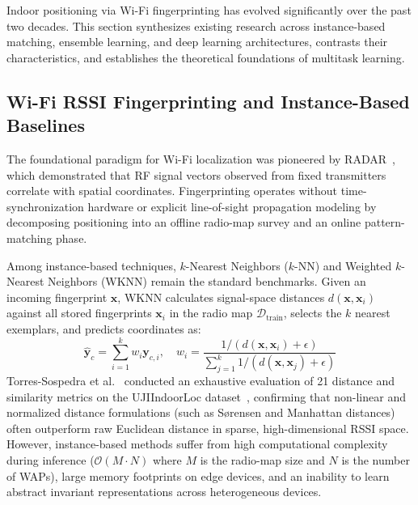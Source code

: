 
\label{sec:related-work}

Indoor positioning via Wi-Fi fingerprinting has evolved significantly over the past two decades. This section synthesizes existing research across instance-based matching, ensemble learning, and deep learning architectures, contrasts their characteristics, and establishes the theoretical foundations of multitask learning.

\subsection{Wi-Fi RSSI Fingerprinting and Instance-Based Baselines}
The foundational paradigm for Wi-Fi localization was pioneered by RADAR~\cite{torres2014ujiindoorloc}, which demonstrated that RF signal vectors observed from fixed transmitters correlate with spatial coordinates. Fingerprinting operates without time-synchronization hardware or explicit line-of-sight propagation modeling by decomposing positioning into an offline radio-map survey and an online pattern-matching phase.

Among instance-based techniques, $k$-Nearest Neighbors ($k$-NN) and Weighted $k$-Nearest Neighbors (WKNN) remain the standard benchmarks. Given an incoming fingerprint $\mathbf{x}$, WKNN calculates signal-space distances $d(\mathbf{x}, \mathbf{x}_i)$ against all stored fingerprints $\mathbf{x}_i$ in the radio map $\mathcal{D}_{\text{train}}$, selects the $k$ nearest exemplars, and predicts coordinates as:
\begin{equation}
    \hat{\mathbf{y}}_c = \sum_{i=1}^k w_i \mathbf{y}_{c,i}, \quad w_i = \frac{1 / (d(\mathbf{x}, \mathbf{x}_i) + \epsilon)}{\sum_{j=1}^k 1 / (d(\mathbf{x}, \mathbf{x}_j) + \epsilon)}
\end{equation}
Torres-Sospedra et al.~\cite{torres2015comprehensive} conducted an exhaustive evaluation of 21 distance and similarity metrics on the UJIIndoorLoc dataset~\cite{torres2014ujiindoorloc}, confirming that non-linear and normalized distance formulations (such as Sørensen and Manhattan distances) often outperform raw Euclidean distance in sparse, high-dimensional RSSI space. However, instance-based methods suffer from high computational complexity during inference ($\mathcal{O}(M \cdot N)$ where $M$ is the radio-map size and $N$ is the number of WAPs), large memory footprints on edge devices, and an inability to learn abstract invariant representations across heterogeneous devices.

